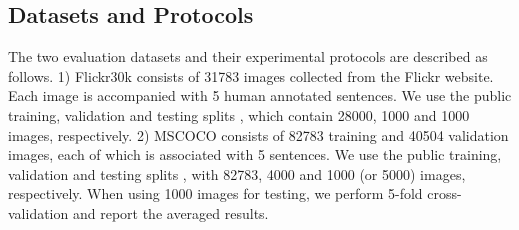 \documentclass[10pt,twocolumn,letterpaper]{article}
\begin{document}
\subsection{Datasets and Protocols}

The two evaluation datasets and their experimental protocols are described as follows.
1) {Flickr30k} \cite{young2014image}
consists of 31783 images collected from the Flickr website.
Each image is accompanied with 5 human annotated sentences.
We use the public training, validation and testing splits \cite{kiros2014unifying}, which
contain 28000, 1000 and 1000 images, respectively.
2) {MSCOCO} \cite{lin2014microsoft} consists of 82783
training and 40504 validation images, each of which is associated with 5 sentences.
We use the public training, validation and testing splits \cite{kiros2014unifying},
with 82783, 4000 and 1000 (or 5000) images, respectively.
When using 1000 images for testing, we perform 5-fold cross-validation
and report the averaged results.
\end{document}
